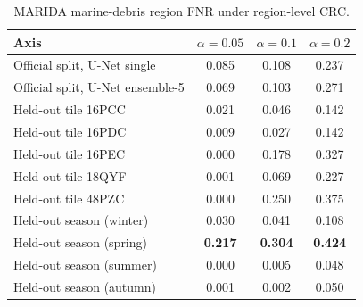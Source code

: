 \begin{table}[t]
\centering
\caption{MARIDA marine-debris region FNR under region-level CRC.}
\label{tab:marida}
\footnotesize
\setlength{\tabcolsep}{3pt}
\begin{tabular}{lccc}
\toprule
Axis & $\alpha=0.05$ & $\alpha=0.1$ & $\alpha=0.2$ \\
\midrule
Official split, U-Net single & 0.085 & 0.108 & 0.237 \\
Official split, U-Net ensemble-5 & 0.069 & 0.103 & 0.271 \\
\addlinespace
Held-out tile 16PCC & 0.021 & 0.046 & 0.142 \\
Held-out tile 16PDC & 0.009 & 0.027 & 0.142 \\
Held-out tile 16PEC & 0.000 & 0.178 & 0.327 \\
Held-out tile 18QYF & 0.001 & 0.069 & 0.227 \\
Held-out tile 48PZC & 0.000 & 0.250 & 0.375 \\
\addlinespace
Held-out season (winter) & 0.030 & 0.041 & 0.108 \\
Held-out season (spring) & \textbf{0.217} & \textbf{0.304} & \textbf{0.424} \\
Held-out season (summer) & 0.000 & 0.005 & 0.048 \\
Held-out season (autumn) & 0.001 & 0.002 & 0.050 \\
\bottomrule
\end{tabular}
\end{table}

